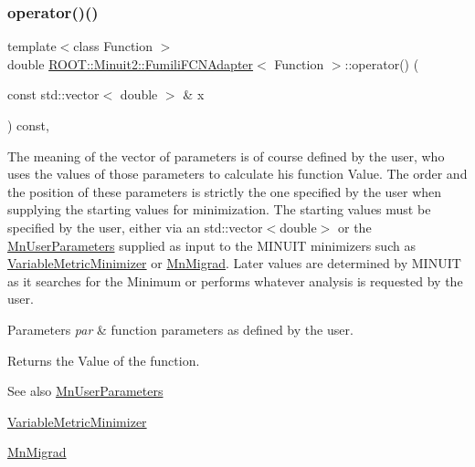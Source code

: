 \mbox{\label{classROOT_1_1Minuit2_1_1FumiliFCNAdapter_a7381e9f93fbec9e0504e3e340c281056}} 
\subsubsection{\texorpdfstring{operator()()}{operator()()}\hspace{0.1cm}{\footnotesize\ttfamily [1/4]}}
{\footnotesize\ttfamily template$<$class Function $>$ \\
double \mbox{\hyperlink{classROOT_1_1Minuit2_1_1FumiliFCNAdapter}{R\+O\+O\+T\+::\+Minuit2\+::\+Fumili\+F\+C\+N\+Adapter}}$<$ Function $>$\+::operator() (\begin{DoxyParamCaption}\item[{const std\+::vector$<$ double $>$ \&}]{x }\end{DoxyParamCaption}) const\hspace{0.3cm}{\ttfamily [inline]}, {\ttfamily [virtual]}}

The meaning of the vector of parameters is of course defined by the user, who uses the values of those parameters to calculate his function Value. The order and the position of these parameters is strictly the one specified by the user when supplying the starting values for minimization. The starting values must be specified by the user, either via an std\+::vector$<$double$>$ or the \mbox{\hyperlink{classROOT_1_1Minuit2_1_1MnUserParameters}{Mn\+User\+Parameters}} supplied as input to the M\+I\+N\+U\+IT minimizers such as \mbox{\hyperlink{classROOT_1_1Minuit2_1_1VariableMetricMinimizer}{Variable\+Metric\+Minimizer}} or \mbox{\hyperlink{classROOT_1_1Minuit2_1_1MnMigrad}{Mn\+Migrad}}. Later values are determined by M\+I\+N\+U\+IT as it searches for the Minimum or performs whatever analysis is requested by the user.


\begin{DoxyParams}{Parameters}
{\em par} & function parameters as defined by the user.\\
\hline
\end{DoxyParams}
\begin{DoxyReturn}{Returns}
the Value of the function.
\end{DoxyReturn}
\begin{DoxySeeAlso}{See also}
\mbox{\hyperlink{classROOT_1_1Minuit2_1_1MnUserParameters}{Mn\+User\+Parameters}} 

\mbox{\hyperlink{classROOT_1_1Minuit2_1_1VariableMetricMinimizer}{Variable\+Metric\+Minimizer}} 

\mbox{\hyperlink{classROOT_1_1Minuit2_1_1MnMigrad}{Mn\+Migrad}} 
\end{DoxySeeAlso}


